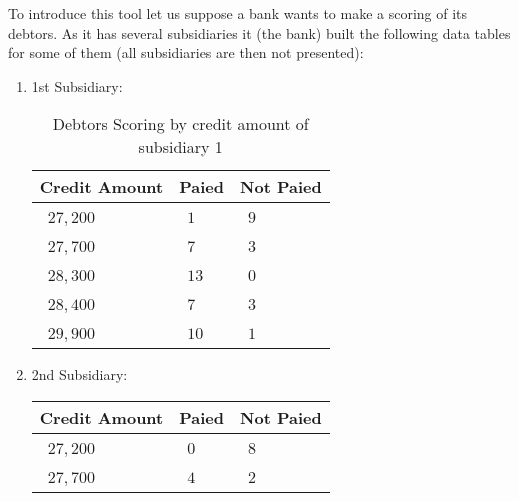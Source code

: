 	
	\pagebreak
		To introduce this tool let us suppose a bank wants to make a scoring of its debtors. As it has several subsidiaries it (the bank) built the following data tables for some of them (all subsidiaries are then not presented):
	\begin{enumerate}
    	\item 1st Subsidiary:
		\begin{table}[H]
		\begin{center}
				\begin{tabular}{|p{2cm}|p{2cm}|p{2cm}|}
					\hline
					\multicolumn{1}{c}{\cellcolor{black!30}\textbf{Credit Amount}} & 
	  \multicolumn{1}{c}{\cellcolor{black!30}\textbf{Paied}}  & \multicolumn{1}{c}{\cellcolor{black!30}\textbf{Not Paied}}\\ \hline
					\centering\arraybackslash\ $27,200$ & \centering\arraybackslash\ $1$ & \centering\arraybackslash\ $9$ \\ \hline
					\centering\arraybackslash\ $27,700$ & \centering\arraybackslash\ $7$ & \centering\arraybackslash\ $3$ \\ \hline
					\centering\arraybackslash\ $28,300$ & \centering\arraybackslash\ $13$ & \centering\arraybackslash\ $0$ \\ \hline
					\centering\arraybackslash\ $28,400$ & \centering\arraybackslash\ $7$ & \centering\arraybackslash\ $3$ \\ \hline
					\centering\arraybackslash\ $29,900$ & \centering\arraybackslash\ $10$ & \centering\arraybackslash\ $1$ \\ \hline
			\end{tabular}
		\end{center}
		\caption[]{Debtors Scoring by credit amount of subsidiary 1}
		\end{table}
		\item 2nd Subsidiary:
			\begin{table}[H]
			\begin{center}
				\definecolor{gris}{gray}{0.85}
				\begin{tabular}{|p{2cm}|p{2cm}|p{2cm}|}
						\hline
						\multicolumn{1}{c}{\cellcolor{black!30}\textbf{Credit Amount}} & 
		  \multicolumn{1}{c}{\cellcolor{black!30}\textbf{Paied}}  & \multicolumn{1}{c}{\cellcolor{black!30}\textbf{Not Paied}}\\ \hline
						\centering\arraybackslash\ $27,200$ & \centering\arraybackslash\ $0$ & \centering\arraybackslash\ $8$ \\ \hline
						\centering\arraybackslash\ $27,700$ & \centering\arraybackslash\ $4$ & \centering\arraybackslash\ $2$ \\ \hline

\end{tabular}
\end{center}
\end{table}
\end{enumerate}

